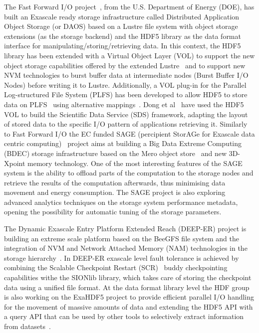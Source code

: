 \documentclass{../../template/esiwace-report}
\begin{document}
The Fast Forward I/O project~\cite{intel_fast_2014}, from the U.S. Department of Energy (DOE), has built an Exascale ready storage infrastructure called Distributed Application Object Storage (or DAOS) based on a Lustre file system with object storage extensions (as the storage backend) and the HDF5 library as the data format interface for manipulating/storing/retrieving data. In this context, the HDF5 library has been extended with a Virtual Object Layer (VOL) to support the new object storage capabilities offered by the extended Lustre~\cite{hdfgroup_future_2015} and to support new NVM technologies to burst buffer data at intermediate nodes (Burst Buffer I/O Nodes) before writing it to Lustre. Additionally, a VOL plug-in for the Parallel Log-structured File System (PLFS) has been developed to allow HDF5 to store data on PLFS~\cite{Bent:2009:PCF:1654059.1654081} using alternative mappings~\cite{mehta_plugin_2012}.
Dong et al~\cite{dong_expediting_2013} have used the HDF5 VOL to build the Scientific Data Service (SDS) framework, adapting the layout of stored data to the specific I/O pattern of applications retrieving it. Similarly to Fast Forward I/O the EC funded SAGE (percipient StorAGe for Exascale data centric computing)~\cite{sage} project aims at building a Big Data Extreme Computing (BDEC) storage infrastructure based on the Mero object store~\cite{sage-wp} and new 3D-Xpoint memory technology. One of the most interesting features of the SAGE system is the ability to offload parts of the computation to the storage nodes and retrieve the results of the computation afterwards, thus minimising data movement and energy consumption. The SAGE project is also exploring advanced analytics techniques on the storage system performance metadata, opening the possibility for automatic tuning of the storage parameters.

The Dynamic Exascale Entry Platform Extended Reach (DEEP-ER) project is building an extreme scale platform based on the BeeGFS file system and the integration of NVM and Network Attached Memory (NAM) technologies in the storage hierarchy~\cite{deep-er}. In DEEP-ER exascale level fault tolerance is achieved by combining the Scalable Checkpoint Restart (SCR)~\cite{Moody:2010:DME:1884643.1884666} buddy checkpointing capabilities withe the SIONlib library, which takes care of storing the checkpoint data using a unified file format. At the data format library level the HDF group is also working on the ExaHDF5 project to provide efficient parallel I/O handling for the movement of massive amounts of data and extending the HDF5 API with a query API that can be used by other tools to selectively extract information from datasets~\cite{exahdf5}.
\end{document}
